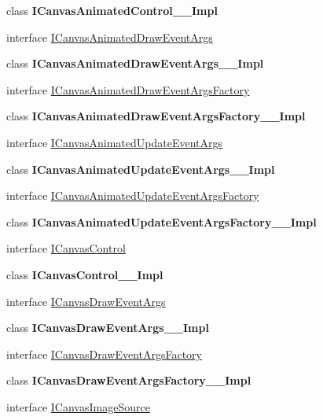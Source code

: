 \begin{DoxyCompactItemize}
\item 
class {\bfseries I\+Canvas\+Animated\+Control\+\_\+\+\_\+\+Impl}
\item 
interface \hyperlink{interface_microsoft_1_1_graphics_1_1_canvas_1_1_u_i_1_1_xaml_1_1_i_canvas_animated_draw_event_args}{I\+Canvas\+Animated\+Draw\+Event\+Args}
\item 
class {\bfseries I\+Canvas\+Animated\+Draw\+Event\+Args\+\_\+\+\_\+\+Impl}
\item 
interface \hyperlink{interface_microsoft_1_1_graphics_1_1_canvas_1_1_u_i_1_1_xaml_1_1_i_canvas_animated_draw_event_args_factory}{I\+Canvas\+Animated\+Draw\+Event\+Args\+Factory}
\item 
class {\bfseries I\+Canvas\+Animated\+Draw\+Event\+Args\+Factory\+\_\+\+\_\+\+Impl}
\item 
interface \hyperlink{interface_microsoft_1_1_graphics_1_1_canvas_1_1_u_i_1_1_xaml_1_1_i_canvas_animated_update_event_args}{I\+Canvas\+Animated\+Update\+Event\+Args}
\item 
class {\bfseries I\+Canvas\+Animated\+Update\+Event\+Args\+\_\+\+\_\+\+Impl}
\item 
interface \hyperlink{interface_microsoft_1_1_graphics_1_1_canvas_1_1_u_i_1_1_xaml_1_1_i_canvas_animated_update_event_args_factory}{I\+Canvas\+Animated\+Update\+Event\+Args\+Factory}
\item 
class {\bfseries I\+Canvas\+Animated\+Update\+Event\+Args\+Factory\+\_\+\+\_\+\+Impl}
\item 
interface \hyperlink{interface_microsoft_1_1_graphics_1_1_canvas_1_1_u_i_1_1_xaml_1_1_i_canvas_control}{I\+Canvas\+Control}
\item 
class {\bfseries I\+Canvas\+Control\+\_\+\+\_\+\+Impl}
\item 
interface \hyperlink{interface_microsoft_1_1_graphics_1_1_canvas_1_1_u_i_1_1_xaml_1_1_i_canvas_draw_event_args}{I\+Canvas\+Draw\+Event\+Args}
\item 
class {\bfseries I\+Canvas\+Draw\+Event\+Args\+\_\+\+\_\+\+Impl}
\item 
interface \hyperlink{interface_microsoft_1_1_graphics_1_1_canvas_1_1_u_i_1_1_xaml_1_1_i_canvas_draw_event_args_factory}{I\+Canvas\+Draw\+Event\+Args\+Factory}
\item 
class {\bfseries I\+Canvas\+Draw\+Event\+Args\+Factory\+\_\+\+\_\+\+Impl}
\item 
interface \hyperlink{interface_microsoft_1_1_graphics_1_1_canvas_1_1_u_i_1_1_xaml_1_1_i_canvas_image_source}{I\+Canvas\+Image\+Source}
\item 

\end{DoxyCompactItemize}

